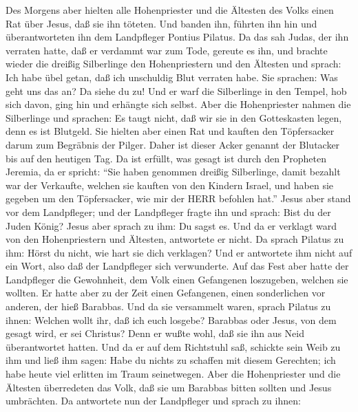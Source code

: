 Des Morgens aber hielten alle Hohenpriester und die
Ältesten des Volks einen Rat über Jesus, daß sie ihn töteten.
 Und banden ihn, führten ihn hin und überantworteten ihn dem
Landpfleger Pontius Pilatus.  Da das sah Judas, der ihn
verraten hatte, daß er verdammt war zum Tode, gereute es ihn, und
brachte wieder die dreißig Silberlinge den Hohenpriestern und den
Ältesten  und sprach: Ich habe übel getan, daß ich
unschuldig Blut verraten habe.  Sie sprachen: Was geht uns
das an? Da siehe du zu! Und er warf die Silberlinge in den Tempel, hob
sich davon, ging hin und erhängte sich selbst.  Aber die
Hohenpriester nahmen die Silberlinge und sprachen: Es taugt nicht, daß
wir sie in den Gotteskasten legen, denn es ist Blutgeld. 
Sie hielten aber einen Rat und kauften den Töpfersacker darum zum
Begräbnis der Pilger.  Daher ist dieser Acker genannt der
Blutacker bis auf den heutigen Tag.  Da ist erfüllt, was
gesagt ist durch den Propheten Jeremia, da er spricht: ``Sie haben
genommen dreißig Silberlinge, damit bezahlt war der Verkaufte, welchen
sie kauften von den Kindern Israel,  und haben sie gegeben
um den Töpfersacker, wie mir der HERR befohlen hat.'' 
Jesus aber stand vor dem Landpfleger; und der Landpfleger fragte ihn und
sprach: Bist du der Juden König? Jesus aber sprach zu ihm: Du sagst es.
 Und da er verklagt ward von den Hohenpriestern und
Ältesten, antwortete er nicht.  Da sprach Pilatus zu ihm:
Hörst du nicht, wie hart sie dich verklagen?  Und er
antwortete ihm nicht auf ein Wort, also daß der Landpfleger sich
verwunderte.  Auf das Fest aber hatte der Landpfleger die
Gewohnheit, dem Volk einen Gefangenen loszugeben, welchen sie wollten.
 Er hatte aber zu der Zeit einen Gefangenen, einen
sonderlichen vor anderen, der hieß Barabbas.  Und da sie
versammelt waren, sprach Pilatus zu ihnen: Welchen wollt ihr, daß ich
euch losgebe? Barabbas oder Jesus, von dem gesagt wird, er sei Christus?
 Denn er wußte wohl, daß sie ihn aus Neid überantwortet
hatten.  Und da er auf dem Richtstuhl saß, schickte sein
Weib zu ihm und ließ ihm sagen: Habe du nichts zu schaffen mit diesem
Gerechten; ich habe heute viel erlitten im Traum seinetwegen.
 Aber die Hohenpriester und die Ältesten überredeten das
Volk, daß sie um Barabbas bitten sollten und Jesus umbrächten.
 Da antwortete nun der Landpfleger und sprach zu ihnen:
